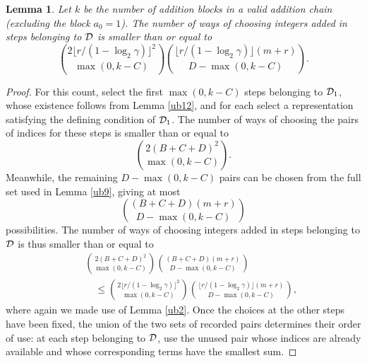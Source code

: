 \documentclass{article}
\newtheorem{lemma}[theorem]{Lemma}
\theoremstyle{definition}
\begin{document}
\begin{lemma}\label{ub13}
Let $k$ be the number of addition blocks in a valid addition chain (excluding the block $a_0=1$).  The number of ways of choosing integers added in steps belonging to ${\cal D}$ is smaller than or equal to
$$
{2\lfloor r/(1-\log_2 \gamma)\rfloor^2 \choose \max(0, k-C)}{\lfloor r/(1-\log_2 \gamma)\rfloor (m+r)\choose D-\max(0,k-C)}.
$$
\end{lemma}
 \begin{proof} 
For this count, select the first $\max(0,k-C)$ steps belonging to ${\cal D}_1$, whose existence follows from Lemma \ref{ub12}, and for each select a representation satisfying the defining condition of ${\cal D}_1$.
The number of ways of choosing the pairs of indices for these steps is smaller than or equal to
$$
{2(B+C+D)^2\choose \max(0,k-C)}.
$$
Meanwhile, the remaining $D-\max(0,k-C)$ pairs can be chosen from the full set used in Lemma \ref{ub9}, giving at most
$$
{(B+C+D)(m+r)\choose D-\max(0,k-C)}
$$
possibilities.
The number of ways of choosing integers added in steps belonging to ${\cal D}$ is thus smaller than or equal to
\begin{eqnarray*}
&& {2(B+C+D)^2\choose \max(0,k-C)}
{(B+C+D)(m+r)\choose D-\max(0,k-C)}\\
&& \quad \le
{2\lfloor r/(1-\log_2\gamma)\rfloor^2\choose \max(0,k-C)}
{\lfloor r/(1-\log_2\gamma)\rfloor(m+r)
 \choose D-\max(0,k-C)},
\end{eqnarray*}
where again we made use of Lemma \ref{ub2}. Once the choices at the other steps have been fixed, the union of the two sets of recorded pairs determines their order of use: at each step belonging to ${\cal D}$, use the unused pair whose indices are already available and whose corresponding terms
have the smallest sum.
  \end{proof}
\end{document}

